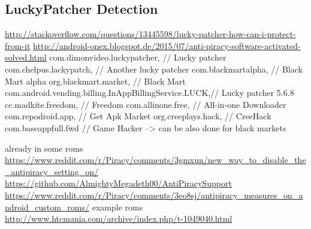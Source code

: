 \subsection{LuckyPatcher Detection}\label{subsection:tampering-luckypatcher}
\url{http://stackoverflow.com/questions/13445598/lucky-patcher-how-can-i-protect-from-it}\newline
\url{http://android-onex.blogspot.de/2015/07/anti-piracy-software-activated-solved.html}\newline
com.dimonvideo.luckypatcher, // Lucky patcher\newline
com.chelpus.lackypatch, // Another lucky patcher\newline
com.blackmartalpha, // Black Mart alpha\newline
org.blackmart.market, // Black Mart\newline
com.android.vending.billing.InAppBillingService.LUCK,// Lucky patcher 5.6.8\newline
cc.madkite.freedom, // Freedom\newline
com.allinone.free, // All-in-one Downloader\newline
com.repodroid.app, // Get Apk Market\newline
org.creeplays.hack, // CreeHack\newline
com.baseappfull.fwd // Game Hacker\newline
--> can be also done for black markets\newline


already in some roms \url{https://www.reddit.com/r/Piracy/comments/3gmxun/new_way_to_disable_the_antipiracy_setting_on/}\newline
\url{https://github.com/AlmightyMegadeth00/AntiPiracySupport}\newline
\url{https://www.reddit.com/r/Piracy/comments/3eo8sj/antipiracy_measures_on_android_custom_roms/}\newline
example roms \url{http://www.htcmania.com/archive/index.php/t-1049040.html}\newline
